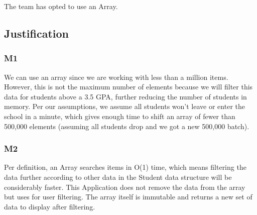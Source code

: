 \documentclass{article}
\begin{document}
The team has opted to use an Array.

\subsection{Justification}

\subsubsection{M1}

We can use an array since we are working with less than a million items. However, this is not the maximum number of elements because we will filter this data for students above a 3.5 GPA, further reducing the number of students in memory. Per our assumptions, we assume all students won't leave or enter the school in a minute, which gives enough time to shift an array of fewer than 500,000 elements (assuming all students drop and we got a new 500,000 batch). 

\subsubsection{M2}

Per definition, an Array searches items in O(1) time, which means filtering the data further according to other data in the Student data structure will be considerably faster. This Application does not remove the data from the array but uses for user filtering. The array itself is immutable and returns a new set of data to display after filtering.
\end{document}
